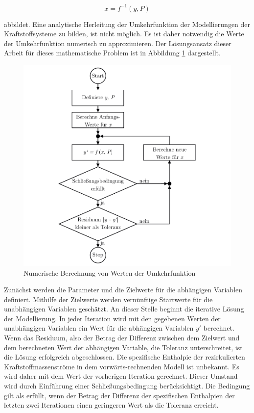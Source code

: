 \begin{equation}\label{Eq:fuel_inverse}
	x = f^{-1}(y, P)
\end{equation}

abbildet. Eine analytische Herleitung der Umkehrfunktion der Modellierungen der Kraftstoffsysteme zu bilden, ist nicht möglich. Es ist daher notwendig die Werte der Umkehrfunktion numerisch zu approximieren. Der Lösungsansatz dieser Arbeit für dieses mathematische Problem ist in Abbildung \ref{fig:solver} dargestellt. 

\begin{figure}[ht]
	\centering
	\includegraphics[width=0.8\linewidth]{4_Abbildungen/2_Hauptteil/solver.pdf}
	\caption{Numerische Berechnung von Werten der Umkehrfunktion}
	\label{fig:solver}
\end{figure}
\FloatBarrier 

Zunächst werden die Parameter und die Zielwerte für die abhängigen Variablen definiert. Mithilfe der Zielwerte werden vernünftige Startwerte für die unabhängigen Variablen geschätzt. An dieser Stelle beginnt die iterative Lösung der Modellierung. In jeder Iteration wird mit den gegebenen Werten der unabhängigen Variablen ein Wert für die abhängigen Variablen $y'$ berechnet. Wenn das Residuum, also der Betrag der Differenz zwischen dem Zielwert und dem  berechneten Wert der abhängigen Variable, die Toleranz unterschreitet, ist die Lösung erfolgreich abgeschlossen. Die spezifische Enthalpie der rezirkulierten Kraftstoffmassenströme in dem vorwärts-rechnenden Modell ist unbekannt. Es wird daher mit dem Wert der vorherigen Iteration gerechnet. Dieser Umstand wird durch Einführung einer Schließungsbedingung berücksichtigt. Die Bedingung gilt als erfüllt, wenn der Betrag der Differenz der spezifischen Enthalpien der letzten zwei Iterationen einen geringeren Wert als die Toleranz erreicht.




